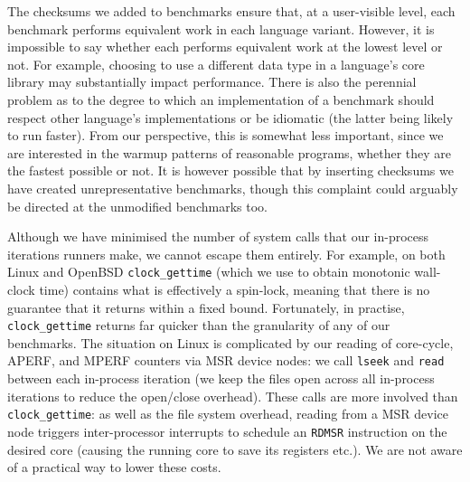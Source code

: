 \documentclass[acmsmall,screen]{acmart}
\begin{document}
The checksums we added to benchmarks ensure that, at a user-visible level, each benchmark
performs equivalent work in each language variant. However, it is impossible to
say whether each performs equivalent work at the lowest level or not. For
example, choosing to use a different data type in a language's core library may
substantially impact performance. There is also the perennial problem as to the
degree to which an implementation of a benchmark should respect other
language's implementations or be idiomatic (the latter being likely to
run faster). From our perspective, this is somewhat less important,
since we are interested in the warmup patterns of reasonable programs,
whether they are the fastest possible or not. It is however possible that by
inserting checksums we have created unrepresentative benchmarks, though
this complaint could arguably be directed at the unmodified benchmarks too.

Although we have minimised the number of system calls that our in-process
iterations runners make, we cannot escape them entirely. For example,
on both Linux and OpenBSD \texttt{clock\_gettime} (which we use to obtain
monotonic wall-clock time) contains what is effectively a spin-lock,
meaning that there is no guarantee that it returns within a fixed bound.
Fortunately, in practise, \texttt{clock\_gettime} returns far quicker than the granularity
of any of our benchmarks. \label{aperf/mperf error} The situation
on Linux is complicated by our reading of core-cycle, APERF, and MPERF
counters via MSR device nodes: we call \texttt{lseek} and \texttt{read}
between each in-process iteration (we keep the files open across all
in-process iterations to reduce the open/close overhead).
These calls are more involved than \texttt{clock\_gettime}:
as well as the file system overhead, reading from a MSR device
node triggers inter-processor interrupts to schedule an \texttt{RDMSR}
instruction on the desired core (causing the running core to save its registers etc.).
We are not aware of a practical way to lower these costs.
\end{document}
